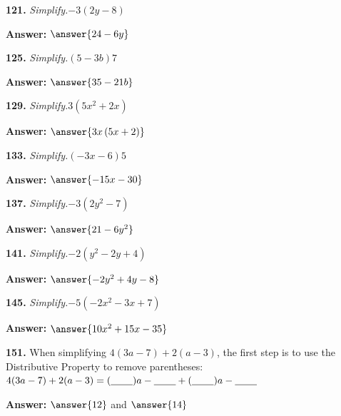 \documentclass{ximera}
\begin{document}
\begin{problem}
\textbf{121.} \emph{Simplify.}\quad $-3(2y - 8)$

\textbf{Answer:} $\answer{24 -6y}$
\end{problem}

\begin{problem}
\textbf{125.} \emph{Simplify.}\quad $(5 - 3b)7$

\textbf{Answer:} $\answer{35 -21b}$
\end{problem}

\begin{problem}
\textbf{129.} \emph{Simplify.}\quad $3(5x^2 + 2x)$

\textbf{Answer:} $\answer{3x\left(5x +2\right)}$
\end{problem}

\begin{problem}
\textbf{133.} \emph{Simplify.}\quad $(-3x - 6)5$

\textbf{Answer:} $\answer{-15x -30}$
\end{problem}

\begin{problem}
\textbf{137.} \emph{Simplify.}\quad $-3(2y^2 - 7)$

\textbf{Answer:} $\answer{21 -6y^{2}}$
\end{problem}

\begin{problem}
\textbf{141.} \emph{Simplify.}\quad $-2(y^2 - 2y + 4)$

\textbf{Answer:} $\answer{-2y^{2} +4y -8}$
\end{problem}

\begin{problem}
\textbf{145.} \emph{Simplify.}\quad $-5(-2x^2 - 3x + 7)$

\textbf{Answer:} $\answer{10x^{2} +15x -35}$
\end{problem}

\begin{problem}
\textbf{151.} When simplifying $4(3a - 7) + 2(a - 3)$, the first step is to use the
  Distributive Property to remove parentheses:
  \\[2pt]
  \hspace*{1.5em}$4(3a - 7) + 2(a - 3) = (\underline{\hspace{2.2em}})a - \underline{\hspace{2.2em}} + (\underline{\hspace{2.2em}})a - \underline{\hspace{2.2em}}$

\textbf{Answer:} $\answer{12}$ and $\answer{14}$
\end{problem}
\end{document}
